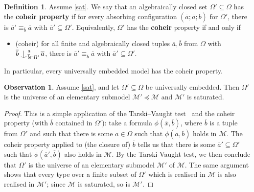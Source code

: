 \documentclass{article}
\theoremstyle{remark}
\theoremstyle{definition}
\newtheorem{definition}[theorem]{Definition}
\newtheorem{observation}[theorem]{Observation}
\newcommand{\M}[0]{\mathcal{M}}
\def\Ind#1#2{#1\setbox0=\hbox{$#1x$}\kern\wd0\hbox to 0pt{\hss$#1\mid$\hss}
	\lower.9\ht0\hbox to 0pt{\hss$#1\smile$\hss}\kern\wd0}
\def\ind{\mathop{\mathpalette\Ind{}}}
\begin{document}
{{{{{  

\begin{definition} Assume \ref{sat}. We say that an algebraically closed set $\Omega'\subseteq\Omega$ has the \textbf{coheir property}
 if for every absorbing configuration $(\overline{a}; \overline{a}; \bar b)$ for $\Omega'$, there is $\overline{a}'\equiv_{\overline{b}}\overline{a}$ with $\overline{a}'\subseteq\Omega'$. Equivalently, $\Omega'$ has the \textbf{coheir} property if and only if
 \begin{itemize}
     \item (coheir) for all finite and algebraically closed tuples $\overline{a}, \overline{b}$ from $\Omega$ with $\overline{b}\ind^{a}_{\overline{b}\cap\Omega'
     } \overline{a}$, there is $\overline{a}'\equiv_{\overline{b}} \overline{a}$ with $\overline{a}'\subseteq \Omega'$.
 \end{itemize}
In particular, every universally embedded model has the coheir property.
\end{definition}


\begin{observation}\label{obs:universally embedded models} Assume \ref{sat},  and 	let $\Omega'\subseteq\Omega$ be universally embedded. Then $\Omega'$ is the universe of
    an elementary submodel $\M'\preceq\M$ and $\M'$ is saturated.
\end{observation}
\begin{proof} This is a simple application of the Tarski--Vaught test~\cite[Theorem 2.1.2]{tent2012course} {and the coheir property (with $\overline{b}$ contained in $\Omega'$): take a formula $\phi(\overline{x}, \overline{b})$, where $\overline{b}$ is a tuple from $\Omega'$ and such that there is some $\overline{a}\in\Omega$ such that $\phi(\overline{a}, \overline{b})$ holds in $\M$. The coheir property applied to (the closure of) $\overline{b}$ tells us that there is some $\overline{a}'\subseteq\Omega'$ such that $\phi(\overline{a}', \overline{b})$ also holds in $\M$. By the Tarski-Vaught test, we then conclude that $\Omega'$ is the universe of an elementary submodel $\M'$ of $\M$. The same argument shows that every type over a finite  subset of $\Omega'$ which is realised in $\M$ is also realised in $\M'$; since $\M$ is  saturated, so is $\M'$.}
\end{proof}




}}}}}
\end{document}
